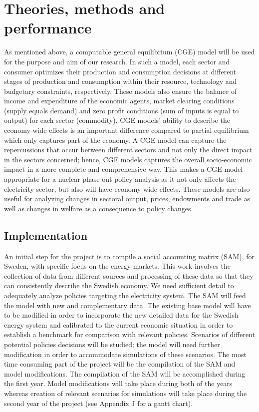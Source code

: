 \section{Theories, methods and performance}
As mentioned above, a computable general equilibrium (CGE) model will be used for the purpose and aim of our research. In such a model, each sector and consumer optimizes their production and consumption decisions at different stages of production and consumption within their resource, technology and budgetary constraints, respectively. These models also ensure the balance of income and expenditure of the economic agents, market clearing conditions (supply equals demand) and zero profit conditions (sum of inputs is equal to output) for each sector (commodity). CGE models' ability to describe the economy-wide effects is an important difference compared to partial equilibrium which only captures part of the economy. A CGE model can capture the repercussions that occur between different sectors and not only the direct impact in the sectors concerned; hence, CGE models captures the overall socio-economic impact in a more complete and comprehensive way. This makes a CGE model appropriate for a nuclear phase out policy analysis as it not only affects the electricity sector, but also will have economy-wide effects. These models are also useful for analyzing changes in sectoral output, prices, endowments and trade as well as changes in welfare as a consequence to policy changes.

\subsection{Implementation}
An initial step for the project is to compile a social accounting matrix (SAM), for Sweden, with specific focus on the energy markets. This work involves the collection of data from different sources and processing of these data so that they can consistently describe the Swedish economy. We need sufficient detail to adequately analyze policies targeting the electricity system. The SAM will feed the model with new and complementary data.
The existing base model will have to be modified in order to incorporate the new detailed data for the Swedish energy system and calibrated to the current economic situation in order to establish a benchmark for comparison with relevant policies. Scenarios of different potential policies decisions will be studied; the model will need further modification in order to accommodate simulations of these scenarios.
The most time consuming part of the project will be the compilation of the SAM and model modifications. The compilation of the SAM will be accomplished during the first year. Model modifications will take place during both of the years whereas creation of relevant scenarios for simulations will take place during the second year of the project (see Appendix J for a gantt chart).

